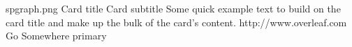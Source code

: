 \documentclass[12pt,a4paper]{article}
\begin{document}
\begin{card}
    {spgraph.png} %
    {Card title}
    {Card subtitle}
    {Some quick example text to build on the card title and make up the bulk of the card's content.}
    {http://www.overleaf.com}
    {Go Somewhere}
    {primary}
\end{card}
\end{document}
